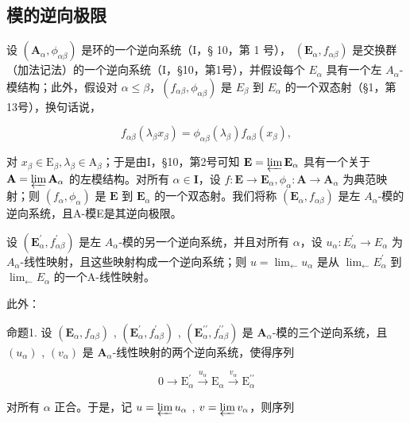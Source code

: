 \subsection{模的逆向极限}

设 \((\mathbf{A}_{\alpha}, \phi_{\alpha\beta})\) 是环的一个逆向系统（I，§ 10，第 1 号）， \((\mathbf{E}_{\alpha}, f_{\alpha\beta})\) 是交换群（加法记法）的一个逆向系统（I，§10，第1号），并假设每个 \(E_{\alpha}\) 具有一个左 \(A_{\alpha}\)-模结构；此外，假设对 \(\alpha \leqslant \beta\)，\((f_{\alpha\beta}, \phi_{\alpha\beta})\) 是 \(E_{\beta}\) 到 \(E_{\alpha}\) 的一个双态射（§1，第13号），换句话说，

\[
f _ {\alpha \beta} (\lambda_ {\beta} x _ {\beta}) = \phi_ {\alpha \beta} (\lambda_ {\beta}) f _ {\alpha \beta} (x _ {\beta}),\tag{1}
\]

对 \(x_{\beta} \in \mathrm{E}_{\beta}, \lambda_{\beta} \in \mathrm{A}_{\beta}\)；于是由I，§10，第2号可知 \(\mathbf{E} = \varprojlim \mathbf{E}_{\alpha}\) 具有一个关于 \(\mathbf{A} = \varprojlim \mathbf{A}_{\alpha}\) 的左模结构。对所有 \(\alpha \in \mathbf{I}\)，设 \(f: \mathbf{E} \to \mathbf{E}_{\alpha}, \phi_{\alpha}: \mathbf{A} \to \mathbf{A}_{\alpha}\) 为典范映射；则 \((f_{\alpha}, \phi_{\alpha})\) 是 \(\mathbf{E}\) 到 \(\mathbf{E}_{\alpha}\) 的一个双态射。我们将称 \((\mathbf{E}_{\alpha}, f_{\alpha\beta})\) 是左 \(A_{\alpha}\)-模的逆向系统，且A-模E是其逆向极限。

设 \((\mathbf{E}_{\alpha}^{\prime}, f_{\alpha\beta}^{\prime})\) 是左 \(A_{\alpha}\)-模的另一个逆向系统，并且对所有 \(\alpha\)，设 \(u_{\alpha}: E_{\alpha}^{\prime} \to E_{\alpha}\) 为 \(A_{\alpha}\)-线性映射，且这些映射构成一个逆向系统；则 \(u = \lim_{\leftarrow} u_{\alpha}\) 是从 \(\lim_{\leftarrow} E_{\alpha}^{\prime}\) 到 \(\lim_{\leftarrow} E_{\alpha}\) 的一个A-线性映射。

此外：

命题1. 设 \((\mathbf{E}_{\alpha}, f_{\alpha\beta})\) , \((\mathbf{E}_{\alpha}^{\prime}, f_{\alpha\beta}^{\prime})\) , \((\mathbf{E}_{\alpha}^{\prime \prime}, f_{\alpha\beta}^{\prime \prime})\) 是 \(\mathbf{A}_{\alpha}\)-模的三个逆向系统，且 \((u_{\alpha})\) , \((v_{\alpha})\) 是 \(\mathbf{A}_{\alpha}\)-线性映射的两个逆向系统，使得序列

\[
0 \longrightarrow \mathrm{E} _ {\alpha} ^ {\prime} \stackrel {u _ {\alpha}} {\longrightarrow} \mathrm{E} _ {\alpha} \stackrel {v _ {\alpha}} {\longrightarrow} \mathrm{E} _ {\alpha} ^ {\prime \prime}
\]

对所有 \(\alpha\) 正合。于是，记 \(u = \varprojlim u_{\alpha}\) , \(v = \varprojlim v_{\alpha}\)，则序列

